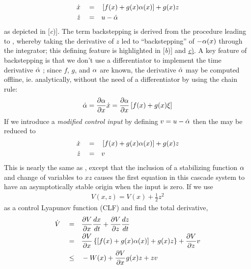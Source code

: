 \documentclass[12pt]{ucthesis}
\begin{document}
	\begin{subequations} \label{eq: bs_step3}
		\begin{align}
			\label{eq: bs_step3a} \dot{x} 	\quad =& \quad \left[ f(x)+g(x)\alpha(x) \right] + g(x)z \\
			\label{eq: bs_step3b} \dot{z} 	\quad =& \quad  u - \dot{\alpha}
		\end{align}
	\end{subequations}
as depicted in [\textit{c})]. The term backstepping is derived from the procedure leading to , whereby taking the derivative of $z$ led to ``backstepping'' of $-\alpha(x)$ through the integrator; this defining feature is highlighted in [\textit{b})] and \hyperref[{fig: bs_blockdiagram}]{\textit{c})}. A key feature of backstepping is that we don't use a differentiator to implement the time derivative $\dot{\alpha}$ ; since $f$, $g$, and $\alpha$ are known, the derivative $\dot{\alpha}$ may be computed offline, ie. analytically, without the need of a differentiator by using the chain rule:
	\begin{equation}
		\dot{\alpha} = \frac{\partial\alpha}{\partial x}\dot{x} = \frac{\partial\alpha}{\partial x}\left[ f(x)+g(x)\xi \right]
		\label{eq: bs_stab_dot}
	\end{equation}
%
\indent If we introduce a \textit{modified control input} by defining $v = u - \dot{\alpha}$ then the  may be reduced to
	\begin{subequations}%
		\begin{align}%
			\label{eq: bs_step4a} \dot{x} 	\quad =& \quad \left[ f(x)+g(x)\stab(x) \right] + g(x)z \\
			\label{eq: bs_step4b} \dot{z} 	\quad =& \quad v
		\end{align}%
	\end{subequations}%
%
\indent This is nearly the same as , except that the inclusion of a stabilizing function $\alpha$ and change of variables to $xz$ causes the first equation in this cascade system to have an asymptotically stable origin when the input is zero. If we use
	\begin{equation}
		\begin{aligned}
			V(x,z) = V(x) + \frac{1}{2}z^2
		\end{aligned}
		\label{eq: bs_step5}
	\end{equation}
as a control Lyapunov function (CLF) and find the total derivative,
	\begin{equation}
		\begin{aligned}
			\dot{V} \quad =& \quad \frac{\partial V}{\partial x}\frac{dx}{dt} + \frac{\partial V}{\partial z}\frac{dz}{dt} \\
					\quad =& \quad \frac{\partial V}{\partial x} \left\lbrace \left[ f(x)+g(x)\alpha(x) \right] + g(x)z \right\rbrace + \frac{\partial V}{\partial z}v \\
					\quad \leq& \quad -W(x) + \frac{\partial V}{\partial x}g(x)z + zv
		\end{aligned}
		\label{eq: bs_step6a}
	\end{equation}
\end{document}
